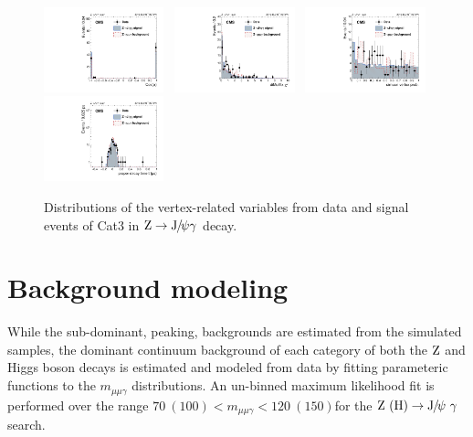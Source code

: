 \begin{figure}[p]
		  \includegraphics[width=0.31\textwidth]{Fig/Final_NoPreliminary/ZJpsiG/CosAlpha_Norm_EE}~
		  \includegraphics[width=0.31\textwidth]{Fig/Final_NoPreliminary/ZJpsiG/diMuChi2_Norm_EE}~
		  \includegraphics[width=0.31\textwidth]{Fig/Final_NoPreliminary/ZJpsiG/VtxProb_Norm_EE}\\
		  \includegraphics[width=0.31\textwidth]{Fig/Final_NoPreliminary/ZJpsiG/ctau_narrowAltBins_EE}\\
		
		  \caption{Distributions of the vertex-related variables from data and signal events of Cat3 in $\mathrm{Z}\to{\mathrm{J}\hspace{-.08em}/\hspace{-.14em}\psi} \gamma$ decay.}
		  \label{fig:vtx_zjpsig_cat3}
		\end{figure}
	\clearpage		
		
		\section{Background modeling}
		\label{sec:BkgModel}
		While the sub-dominant, peaking, backgrounds are estimated from the simulated samples, the dominant continuum background of each category of both the $\mathrm{Z}$ and Higgs boson decays is estimated and modeled	from data by fitting parameteric functions to the $m_{\mu\mu\gamma}$	distributions.  An un-binned maximum likelihood fit is performed over the range $70\ (100) < m_{\mu\mu\gamma} < 120\ (150)$\GeV for the $\mathrm{Z}\ (\mathrm{H})\to{\mathrm{J}\hspace{-.08em}/\hspace{-.14em}\psi}\ \gamma$ search.
		
